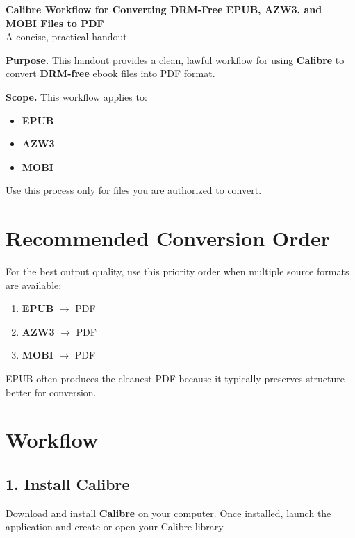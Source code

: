 \documentclass[11pt]{article}
\begin{document}
\begin{center}
    {\LARGE \textbf{Calibre Workflow for Converting DRM-Free EPUB, AZW3, and MOBI Files to PDF}}\\[0.75em]
    {\large A concise, practical handout}\\[1em]
\end{center}

\noindent\textbf{Purpose.} This handout provides a clean, lawful workflow for using \textbf{Calibre} to convert \textbf{DRM-free} ebook files into PDF format.

\medskip

\noindent\textbf{Scope.} This workflow applies to:
\begin{itemize}
    \item \textbf{EPUB}
    \item \textbf{AZW3}
    \item \textbf{MOBI}
\end{itemize}

\noindent Use this process only for files you are authorized to convert.

\section{Recommended Conversion Order}

For the best output quality, use this priority order when multiple source formats are available:

\begin{enumerate}
    \item \textbf{EPUB} $\rightarrow$ PDF
    \item \textbf{AZW3} $\rightarrow$ PDF
    \item \textbf{MOBI} $\rightarrow$ PDF
\end{enumerate}

\noindent EPUB often produces the cleanest PDF because it typically preserves structure better for conversion.

\section{Workflow}

\subsection{1. Install Calibre}

Download and install \textbf{Calibre} on your computer. Once installed, launch the application and create or open your Calibre library.
\end{document}
